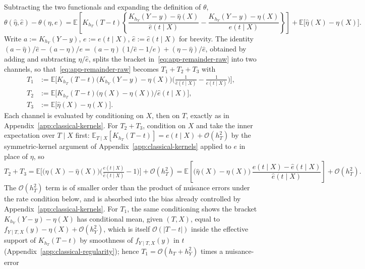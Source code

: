 \documentclass[11pt]{article}
\theoremstyle{plain}
\theoremstyle{definition}
\theoremstyle{remark}
\newcommand{\pE}{\ensuremath{\mathbb{E}}}
\newcommand{\cO}{\mathcal{O}}
\newcommand{\gps}{e}
\begin{document}
Subtracting the two functionals and expanding the definition of $\theta$,
\begin{equation}
\theta(\widehat\eta,\widehat\gps) - \theta(\eta,\gps)
= \pE\!\left[ K_{h_T}(T-t)\left\{
\frac{K_{h_Y}(Y-y)-\widehat\eta(X)}{\widehat\gps(t\mid X)}
- \frac{K_{h_Y}(Y-y)-\eta(X)}{\gps(t\mid X)} \right\} \right]
+ \pE\big[\widehat\eta(X)-\eta(X)\big].
\label{eq:app-remainder-raw}
\end{equation}
Write $a := K_{h_Y}(Y-y)$, $e := \gps(t\mid X)$, $\widehat e := \widehat\gps(t\mid X)$ for
brevity. The identity
$(a-\widehat\eta)/\widehat e - (a-\eta)/e = (a-\eta)(1/\widehat e - 1/e) + (\eta-\widehat\eta)/\widehat e$,
obtained by adding and subtracting $\eta/\widehat e$, splits the bracket in~\eqref{eq:app-remainder-raw}
into two channels, so that~\eqref{eq:app-remainder-raw} becomes $T_1 + T_2 + T_3$ with
\begin{align}
T_1 &:= \pE\Big[ K_{h_T}(T-t)\big(K_{h_Y}(Y-y)-\eta(X)\big)\Big( \tfrac{1}{\widehat\gps(t\mid X)} - \tfrac{1}{\gps(t\mid X)} \Big) \Big], \label{eq:app-T1}\\
T_2 &:= \pE\Big[ K_{h_T}(T-t)\big(\eta(X)-\widehat\eta(X)\big)/\widehat\gps(t\mid X) \Big], \label{eq:app-T2}\\
T_3 &:= \pE\big[\widehat\eta(X)-\eta(X)\big]. \label{eq:app-T3}
\end{align}
Each channel is evaluated by conditioning on $X$, then on $T$, exactly as in
Appendix~\ref{app:classical-kernels}. For $T_2+T_3$, condition on $X$ and take the inner
expectation over $T\mid X$ first: $\pE_{T\mid X}[K_{h_T}(T-t)] = \gps(t\mid X) + \cO(h_T^2)$ by
the symmetric-kernel argument of Appendix~\ref{app:classical-kernels} applied to $\gps$ in place
of $\eta$, so
\[
T_2 + T_3
= \pE\Big[ \big(\eta(X)-\widehat\eta(X)\big)\Big(\tfrac{\gps(t\mid X)}{\widehat\gps(t\mid X)} - 1\Big) \Big] + \cO(h_T^2)
= \pE\!\left[ \big(\widehat\eta(X)-\eta(X)\big)\,\frac{\gps(t\mid X)-\widehat\gps(t\mid X)}{\widehat\gps(t\mid X)} \right] + \cO(h_T^2) .
\]
The $\cO(h_T^2)$ term is of smaller order than the product of nuisance errors under the rate
condition below, and is absorbed into the bias already controlled by
Appendix~\ref{app:classical-kernels}. For $T_1$, the same conditioning shows the bracket
$K_{h_Y}(Y-y)-\eta(X)$ has conditional mean, given $(T,X)$, equal to
$f_{Y\mid T,X}(y)-\eta(X) + \cO(h_Y^2)$, which is itself $\cO(|T-t|)$ inside the effective
support of $K_{h_T}(T-t)$ by smoothness of $f_{Y\mid T,X}(y)$ in $t$
(Appendix~\ref{app:classical-regularity}); hence $T_1 = \cO(h_T+h_Y^2)$ times a nuisance-error
\end{document}
